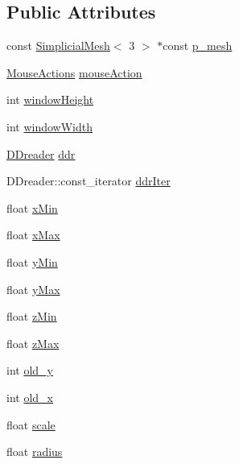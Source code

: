 \subsection*{Public Attributes}
\begin{DoxyCompactItemize}
\item 
const \hyperlink{classmodel_1_1_simplicial_mesh}{Simplicial\+Mesh}$<$ 3 $>$ $\ast$const \hyperlink{structmodel_1_1_d_dgl_ae9bc30c2c3aa6dee243d01b8da9241b6}{p\+\_\+mesh}
\item 
\hyperlink{structmodel_1_1_d_dgl_a75a4f7f76c2ef6659a294b0fd96e5433}{Mouse\+Actions} \hyperlink{structmodel_1_1_d_dgl_a1b754a95145c6b728f2122397aa868d9}{mouse\+Action}
\item 
int \hyperlink{structmodel_1_1_d_dgl_a5c03c6cee2fb5224cefb3aa890256897}{window\+Height}
\item 
int \hyperlink{structmodel_1_1_d_dgl_a8bb0d0d2d58b2065f85b830fa8c5822a}{window\+Width}
\item 
\hyperlink{classmodel_1_1_d_dreader}{D\+Dreader} \hyperlink{structmodel_1_1_d_dgl_a77fece43bf684300ff35f3d55f82fa45}{ddr}
\item 
D\+Dreader\+::const\+\_\+iterator \hyperlink{structmodel_1_1_d_dgl_ae751fe8e3ed0b4843e8057f284c0abe9}{ddr\+Iter}
\item 
float \hyperlink{structmodel_1_1_d_dgl_a506340e0a66380433e3ca1e4f9d8f95e}{x\+Min}
\item 
float \hyperlink{structmodel_1_1_d_dgl_aa9ea5a5aafc2775c8022a29f787ea41a}{x\+Max}
\item 
float \hyperlink{structmodel_1_1_d_dgl_a730ec25b5387a8c488449968af6b9d64}{y\+Min}
\item 
float \hyperlink{structmodel_1_1_d_dgl_a80d31e53bf364c759dc006cbac96eec2}{y\+Max}
\item 
float \hyperlink{structmodel_1_1_d_dgl_a55e12eb67bb8dee9793469e0dec32611}{z\+Min}
\item 
float \hyperlink{structmodel_1_1_d_dgl_a7a0d96300779762d00f269a7bd4001d8}{z\+Max}
\item 
int \hyperlink{structmodel_1_1_d_dgl_a45503561f1299f9588201ee29e285810}{old\+\_\+y}
\item 
int \hyperlink{structmodel_1_1_d_dgl_a472ba9264ba52075f77c06cf3a9cc7fa}{old\+\_\+x}
\item 
float \hyperlink{structmodel_1_1_d_dgl_a7f18f8a2d6cdba89dc759ca2bf2dea6b}{scale}
\item 
float \hyperlink{structmodel_1_1_d_dgl_a844fb9dcdab7857454bbc8eb6949e101}{radius}
\item 

\end{DoxyCompactItemize}
